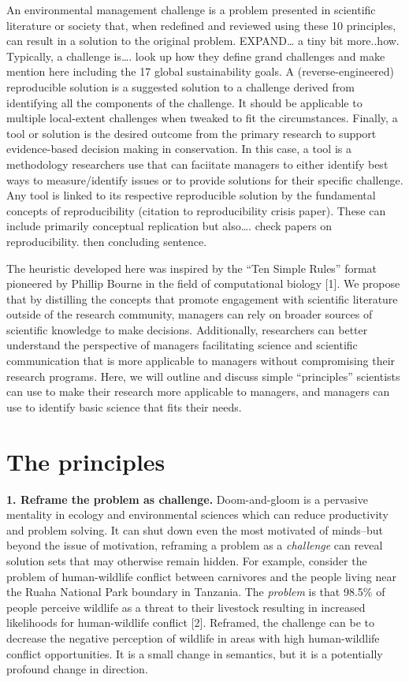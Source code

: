 \documentclass[10pt,letterpaper]{article}
\begin{document}
An environmental management challenge is a problem presented in
scientific literature or society that, when redefined and reviewed using
these 10 principles, can result in a solution to the original problem.
EXPAND\ldots{} a tiny bit more..how. Typically, a challenge is\ldots{}.
look up how they define grand challenges and make mention here including
the 17 global sustainability goals. A (reverse-engineered) reproducible
solution is a suggested solution to a challenge derived from identifying
all the components of the challenge. It should be applicable to multiple
local-extent challenges when tweaked to fit the circumstances. Finally,
a tool or solution is the desired outcome from the primary research to
support evidence-based decision making in conservation. In this case, a
tool is a methodology researchers use that can faciitate managers to
either identify best ways to measure/identify issues or to provide
solutions for their specific challenge. Any tool is linked to its
respective reproducible solution by the fundamental concepts of
reproducibility (citation to reproducibility crisis paper). These can
include primarily conceptual replication but also\ldots{}. check papers
on reproducibility. then concluding sentence.

The heuristic developed here was inspired by the ``Ten Simple Rules''
format pioneered by Phillip Bourne in the field of computational biology
{[}1{]}. We propose that by distilling the concepts that promote
engagement with scientific literature outside of the research community,
managers can rely on broader sources of scientific knowledge to make
decisions. Additionally, researchers can better understand the
perspective of managers facilitating science and scientific
communication that is more applicable to managers without compromising
their research programs. Here, we will outline and discuss simple
``principles'' scientists can use to make their research more applicable
to managers, and managers can use to identify basic science that fits
their needs.

\section{The principles}\label{the-principles}

\textbf{1. Reframe the problem as challenge.} Doom-and-gloom is a
pervasive mentality in ecology and environmental sciences which can
reduce productivity and problem solving. It can shut down even the most
motivated of minds--but beyond the issue of motivation, reframing a
problem as a \emph{challenge} can reveal solution sets that may
otherwise remain hidden. For example, consider the problem of
human-wildlife conflict between carnivores and the people living near
the Ruaha National Park boundary in Tanzania. The \emph{problem} is that
98.5\% of people perceive wildlife as a threat to their livestock
resulting in increased likelihoods for human-wildlife conflict {[}2{]}.
Reframed, the challenge can be to decrease the negative perception of
wildlife in areas with high human-wildlife conflict opportunities. It is
a small change in semantics, but it is a potentially profound change in
direction.
\end{document}

